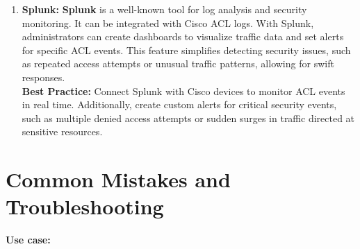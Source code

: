 \documentclass[11pt,a4paper]{article}
\begin{document}
\begin{enumerate}
            \item \textbf{Splunk:} \textbf{Splunk} is a well-known tool for log analysis and security monitoring. It can be integrated with Cisco ACL logs. With Splunk, administrators can create dashboards to visualize traffic data and set alerts for specific ACL events. This feature simplifies detecting security issues, such as repeated access attempts or unusual traffic patterns, allowing for swift responses.
            \\[1em]
            \textbf{Best Practice:} Connect Splunk with Cisco devices to monitor ACL events in real time. Additionally, create custom alerts for critical security events, such as multiple denied access attempts or sudden surges in traffic directed at sensitive resources.

        \end{enumerate}

\section*{Common Mistakes and Troubleshooting}

\newpage


                \textbf{Use case:} 





\newpage


\begin{multicols}{2}
    \small
    
    \makeatletter
  \renewcommand\@biblabel[1]{#1.} 
    
   
\end{multicols}
  
\end{document}

